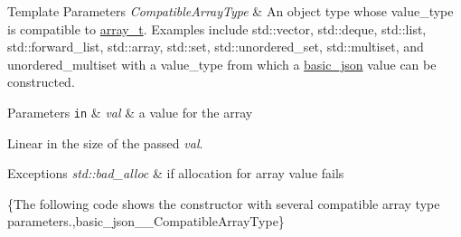 \begin{DoxyTemplParams}{Template Parameters}
{\em Compatible\-Array\-Type} & An object type whose {\ttfamily value\-\_\-type} is compatible to \hyperlink{classnlohmann_1_1basic__json_ab00b882d39306d663c23dab110f5cae0}{array\-\_\-t}. Examples include {\ttfamily std\-::vector}, {\ttfamily std\-::deque}, {\ttfamily std\-::list}, {\ttfamily std\-::forward\-\_\-list}, {\ttfamily std\-::array}, {\ttfamily std\-::set}, {\ttfamily std\-::unordered\-\_\-set}, {\ttfamily std\-::multiset}, and {\ttfamily unordered\-\_\-multiset} with a {\ttfamily value\-\_\-type} from which a \hyperlink{classnlohmann_1_1basic__json}{basic\-\_\-json} value can be constructed.\\
\hline
\end{DoxyTemplParams}

\begin{DoxyParams}[1]{Parameters}
\mbox{\tt in}  & {\em val} & a value for the array\\
\hline
\end{DoxyParams}
Linear in the size of the passed {\itshape val}.


\begin{DoxyExceptions}{Exceptions}
{\em std\-::bad\-\_\-alloc} & if allocation for array value fails\\
\hline
\end{DoxyExceptions}
\{The following code shows the constructor with several compatible array type parameters.,basic\-\_\-json\-\_\-\-\_\-\-Compatible\-Array\-Type\}

